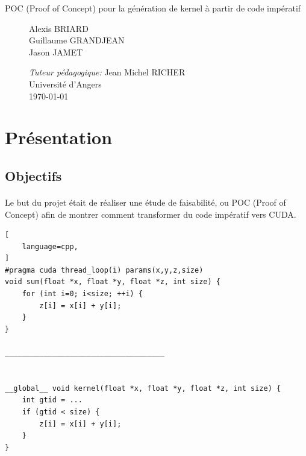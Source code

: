 \documentclass{article}
\begin{document}
\begin{titlepage}
\begin{center}
\begin{Huge}
			\end{Huge}
			\begin{Large}
				POC (Proof of Concept) pour la génération de kernel à partir de code impératif
			\end{Large}		
			 
		\end{center}
		
		
  		\begin{figure}[b]
  		 \begin{minipage}{0.4\textwidth}
			\begin{flushleft} \large
				Alexis BRIARD\\
				Guillaume GRANDJEAN\\
				Jason JAMET
    		\end{flushleft}
    		\end{minipage}
    		\begin{minipage}{0.6\textwidth}
			\begin{flushright} \large
				\emph{Tuteur pédagogique:} Jean Michel RICHER\\				
        		Université d'Angers\\
        		\today
    		\end{flushright}
    	\end{minipage}
		\end{figure}

    	
	\end{titlepage}



\newpage
\thispagestyle{empty}
\mbox{}
\setcounter{page}{0}
\glsresetall
\newpage
\tableofcontents
\newpage

	\section{Présentation}

	\subsection{Objectifs}

	\paragraph{}
	Le but du projet était de réaliser une étude de faisabilité, ou POC (Proof of Concept) afin de montrer comment transformer du code impératif vers CUDA.
	
	\begin{lstlisting}[
    language=cpp,
]
#pragma cuda thread_loop(i) params(x,y,z,size) 
void sum(float *x, float *y, float *z, int size) { 
	for (int i=0; i<size; ++i) {
		z[i] = x[i] + y[i];
	}
}

_____________________________________


__global__ void kernel(float *x, float *y, float *z, int size) { 
	int gtid = ...
	if (gtid < size) {
		z[i] = x[i] + y[i];
	}
}
	
	\end{lstlisting}	
	
\end{document}
